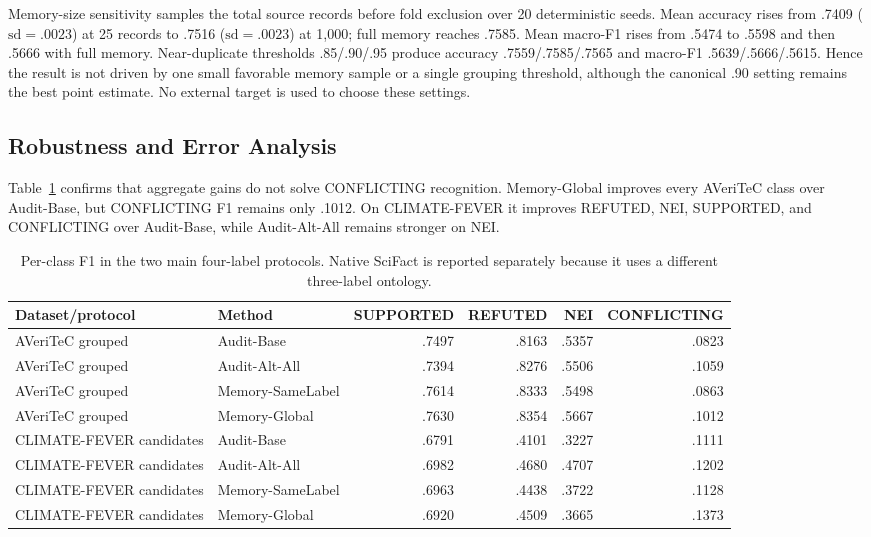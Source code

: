\documentclass[runningheads]{llncs}
\begin{document}
Memory-size sensitivity samples the total source records before fold exclusion
over 20 deterministic seeds. Mean accuracy rises from .7409
($\mathrm{sd}=.0023$) at 25 records to .7516
($\mathrm{sd}=.0023$) at 1,000; full memory reaches .7585. Mean macro-F1 rises
from .5474 to .5598 and then .5666 with full memory. Near-duplicate thresholds
.85/.90/.95 produce accuracy .7559/.7585/.7565 and macro-F1
.5639/.5666/.5615. Hence the result is not driven by one small favorable
memory sample or a single grouping threshold, although the canonical .90
setting remains the best point estimate. No external target is used to choose
these settings.

\subsection{Robustness and Error Analysis}

Table~\ref{tab:per-class} confirms that aggregate gains do not solve
CONFLICTING recognition. Memory-Global improves every AVeriTeC class over Audit-Base, but
CONFLICTING F1 remains only .1012. On CLIMATE-FEVER it improves REFUTED, NEI,
SUPPORTED, and CONFLICTING over Audit-Base, while Audit-Alt-All remains stronger on NEI.

\begin{table}[t]
\caption{Per-class F1 in the two main four-label protocols. Native SciFact is
reported separately because it uses a different three-label ontology.}
\label{tab:per-class}
\centering\small
\begin{tabular}{llrrrr}
\toprule
Dataset/protocol & Method & SUPPORTED & REFUTED & NEI & CONFLICTING \\
\midrule
AVeriTeC grouped & Audit-Base & .7497 & .8163 & .5357 & .0823 \\
AVeriTeC grouped & Audit-Alt-All & .7394 & .8276 & .5506 & .1059 \\
AVeriTeC grouped & Memory-SameLabel & .7614 & .8333 & .5498 & .0863 \\
AVeriTeC grouped & Memory-Global & .7630 & .8354 & .5667 & .1012 \\
\midrule
CLIMATE-FEVER candidates & Audit-Base & .6791 & .4101 & .3227 & .1111 \\
CLIMATE-FEVER candidates & Audit-Alt-All & .6982 & .4680 & .4707 & .1202 \\
CLIMATE-FEVER candidates & Memory-SameLabel & .6963 & .4438 & .3722 & .1128 \\
CLIMATE-FEVER candidates & Memory-Global & .6920 & .4509 & .3665 & .1373 \\
\bottomrule
\end{tabular}
\end{table}
\end{document}
